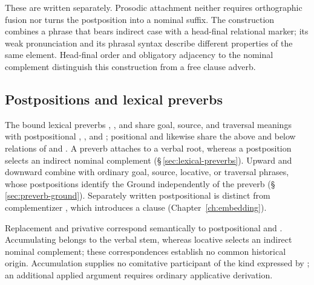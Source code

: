 These  are written separately. Prosodic
attachment neither requires orthographic fusion nor turns the postposition into
a nominal suffix. The construction combines a phrase that bears indirect case
with a head-final relational marker; its weak pronunciation and its phrasal
syntax describe different properties of the same element.
Head-final order and obligatory adjacency to the nominal complement distinguish
this construction from a free clause adverb.

\subsection{Postpositions and lexical preverbs}
\label{sec:nm-postp-preverbs}

The bound lexical preverbs , , and 
share goal, source, and traversal meanings with postpositional ,
, and ; positional  and  likewise
share the above and below relations of  and . A preverb
attaches to a verbal root, whereas a postposition selects an indirect nominal
complement (§\,\ref{sec:lexical-preverbs}). Upward  and downward
 combine with ordinary goal, source, locative, or traversal phrases,
whose postpositions identify the Ground independently of the preverb
(§\,\ref{sec:preverb-ground}). Separately written
postpositional  is distinct from complementizer , which
introduces a clause
(Chapter~\ref{ch:embedding}).

Replacement  and privative  correspond semantically
to postpositional  and . Accumulating 
belongs to the verbal stem, whereas locative  selects an indirect
nominal complement; these correspondences establish no common historical
origin. Accumulation supplies no comitative participant of the kind expressed
by ; an additional applied argument requires ordinary applicative
derivation.

\FloatBarrier
